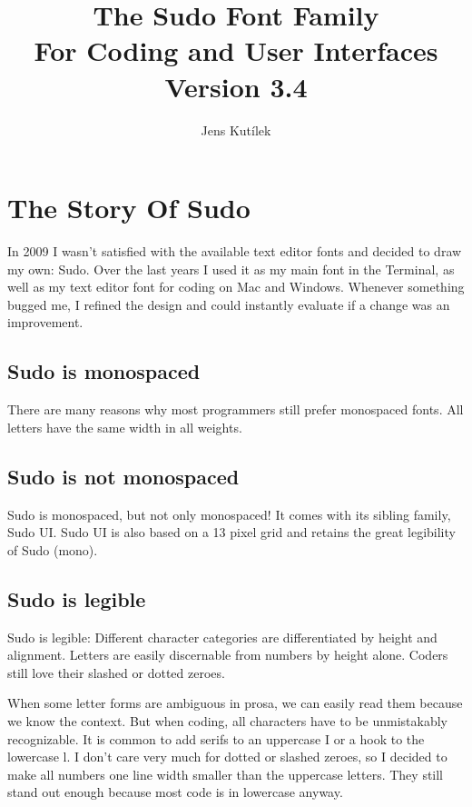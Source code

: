 \documentclass[paper=a4, 10pt]{scrbook}
\title{The Sudo Font Family\\ For Coding and User Interfaces\\ Version 3.4}
\author{Jens Kutílek}
\begin{document}
\maketitle

\tableofcontents

\chapter{The Story Of Sudo}

In 2009 I wasn’t satisfied with the available text editor fonts and decided to draw my own: Sudo. Over the last years I used it as my main font in the Terminal, as well as my text editor font for coding on Mac and Windows. Whenever something bugged me, I refined the design and could instantly evaluate if a change was an improvement.

\section{Sudo is mono­spaced}

There are many reasons why most programmers still prefer monospaced fonts. All letters have the same width in all weights.

\section{Sudo is not mono­spaced}
Sudo is monospaced, but not only monospaced! It comes with its sibling family, Sudo UI. Sudo UI is also based on a 13 pixel grid and retains the great legibility of Sudo (mono).

\section{Sudo is legible}
Sudo is legible: Different character categories are differentiated by height and alignment. Letters are easily discernable from numbers by height alone. Coders still love their slashed or dotted zeroes.

When some letter forms are ambiguous in prosa, we can easily read them because we know the context. But when coding, all characters have to be unmistakably recognizable. It is common to add serifs to an uppercase I or a hook to the lowercase l. I don’t care very much for dotted or slashed zeroes, so I decided to make all numbers one line width smaller than the uppercase letters. They still stand out enough because most code is in lowercase anyway.
\end{document}
